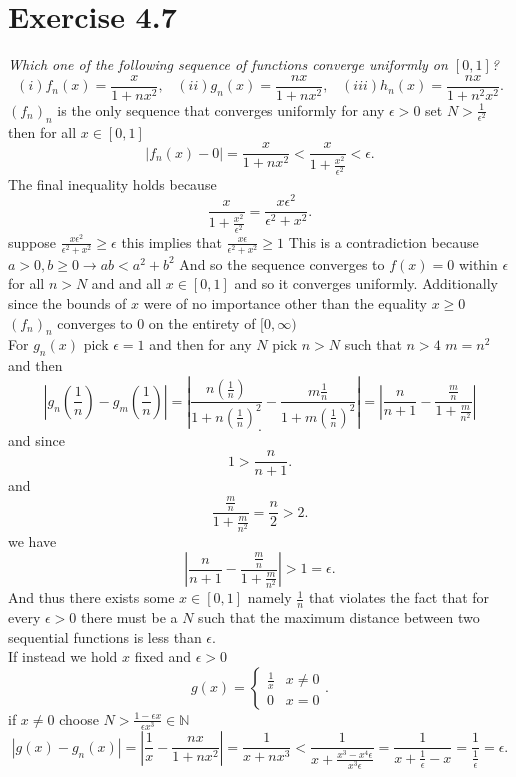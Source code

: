\documentclass{amsart}
\begin{document}
    \section{Exercise 4.7}
    \emph{
        Which one of the following sequence of functions converge uniformly on $[0,1]$?
         \[
             (i)f_n(x) = \frac{x}{1+nx^2}, \;\;\; (ii)g_n(x) = \frac{nx}{1+nx^2}, \;\;\; (iii)h_n(x) = \frac{nx}{1+n^2x^2}
        .\] 
    }
    $(f_n)_n$  is the only sequence that converges uniformly
    for any $\epsilon > 0$ set $N > \frac{1}{\epsilon^2}$ then for all $x \in [0,1]$ 
    \[
    |f_n(x) - 0| = \frac{x}{1+nx^2}  < \frac{x}{1+\frac{x^2}{\epsilon^2}} < \epsilon
    .\] 
    The final inequality holds because
    \[
    \frac{x}{1+\frac{x^2}{\epsilon^2}} = \frac{x\epsilon^2}{\epsilon^2+x^2}
    .\] 
    suppose $\frac{x\epsilon^2}{\epsilon^2+x^2} \ge \epsilon$ this implies that $\frac{x\epsilon}{\epsilon^2+x^2} \ge 1$
    This is a contradiction because $a > 0,b \ge 0 \rightarrow ab < a^2 + b^2$
    And so the sequence converges to $f(x) = 0$ within $\epsilon$ for all $n > N$ and and all $x \in [0,1]$ and so it converges uniformly.
    Additionally since the bounds of $x$ were of no importance other than the equality $x \ge 0$ $(f_n)_n$ converges to $0$ on the entirety of $[0,\infty)$
    \\
    For $g_n(x)$ pick $\epsilon = 1$ and then for any $N$  pick $n > N $ such that $n > 4$ $m = n^2$ and then
    \[
    |g_n( \frac{1}{n}) - g_m( \frac{1}{n})| = |\frac{n(\frac{1}{n})}{1+n(\frac{1}{n})^2} - \frac{m \frac{1}{n}}{1 + m (\frac{1}{n})^2}| = |\frac{n}{n+1} -\frac{\frac{m}{n}}{1+\frac{m}{n^2}}| \]\[
    .\] 
    and since 
    \[
     1 > \frac{n}{n+1} 
    .\] 
    and
    \[
        \frac{\frac{m}{n}}{1+\frac{m}{n^2}} = \frac{n}{2} > 2
    .\] 
    we have
    \[
    |\frac{n}{n+1} - \frac{\frac{m}{n}}{1+\frac{m}{n^2}}| > 1 = \epsilon
    .\] 
    And thus there exists some $x \in [0,1]$ namely $\frac{1}{n}$ that violates the fact that for every $\epsilon > 0$ there must be a $N$ such that the
    maximum distance between two sequential functions is less than $\epsilon$.
    \\
    If instead we hold $x$ fixed and $\epsilon > 0$ 
    \[
    g(x) =
    \begin{cases}
        \frac{1}{x} &x \ne 0\\
        0 & x =0
    \end{cases}
    .\] 
    if $x \ne 0$ choose $N > \frac{1-\epsilon x}{\epsilon x^{3}} \in \mathbb{N} $
    \[
    |g(x) - g_n(x)| = |\frac{1}{x}-\frac{nx}{1+nx^{2}}| = \frac{1}{x+nx^{3}} < \frac{1}{x+\frac{x^{3}-x^{4}\epsilon}{x^{3}\epsilon}} = \frac{1}{x+\frac{1}{\epsilon}-x} = \frac{1}{\frac{1}{\epsilon}} = \epsilon
    .\] 
\end{document}

